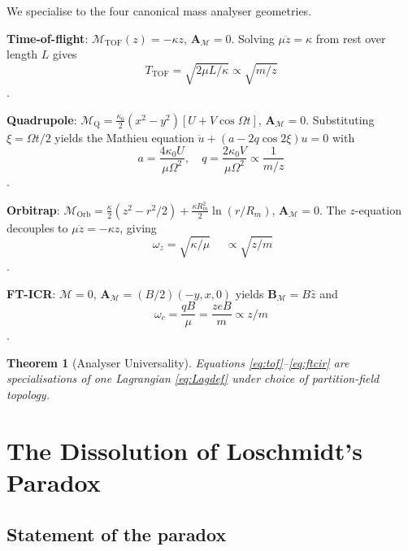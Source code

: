\documentclass[twocolumn,10pt,a4paper]{article}
\theoremstyle{thmstyle}
\newtheorem{theorem}{Theorem}[section]
\theoremstyle{definition}
\theoremstyle{remark}
\newcommand{\Depth}{\mathcal{M}}
\newcommand{\partinert}{\mu}
\newcommand{\Apartition}{\mathbf{A}_{\Depth}}
\begin{document}
We specialise to the four canonical mass analyser geometries.

\textbf{Time-of-flight}: $\Depth_{\mathrm{TOF}}(z)=-\kappa z$,
$\Apartition=0$. Solving $\partinert\ddot z=\kappa$ from rest over
length $L$ gives
\begin{equation}
T_{\mathrm{TOF}}=\sqrt{2\partinert L/\kappa}\propto\sqrt{m/z}
\label{eq:tof}
\end{equation}
\citep{wiley1955}.

\textbf{Quadrupole}: $\Depth_{\mathrm{Q}}=\tfrac{\kappa_{0}}{2}(x^{2}-y^{2})[U+V\cos\Omega t]$,
$\Apartition=0$. Substituting $\xi=\Omega t/2$ yields the Mathieu
equation $\ddot u+(a-2q\cos 2\xi)u=0$ with
\begin{equation}
a=\frac{4\kappa_{0}U}{\partinert\Omega^{2}},\quad
q=\frac{2\kappa_{0}V}{\partinert\Omega^{2}}\propto\frac{1}{m/z}
\label{eq:mathieu}
\end{equation}
\citep{paul1990,march2005}.

\textbf{Orbitrap}: $\Depth_{\mathrm{Orb}}=\tfrac{\kappa}{2}(z^{2}-r^{2}/2)
+\tfrac{\kappa R_{m}^{2}}{2}\ln(r/R_{m})$, $\Apartition=0$. The
$z$-equation decouples to $\partinert\ddot z=-\kappa z$, giving
\begin{equation}
\boxed{\;\omega_{z}=\sqrt{\kappa/\partinert}\;}
\quad\propto\sqrt{z/m}
\label{eq:orb}
\end{equation}
\citep{makarov2000}.

\textbf{FT-ICR}: $\Depth=0$, $\Apartition=(B/2)(-y,x,0)$ yields
$\mathbf{B}_{\Depth}=B\hat z$ and
\begin{equation}
\omega_{c}=\frac{qB}{\partinert}=\frac{zeB}{m}\propto z/m
\label{eq:ftcir}
\end{equation}
\citep{marshall1998}.

\begin{theorem}[Analyser Universality]
\label{thm:univ}
Equations \eqref{eq:tof}--\eqref{eq:ftcir} are specialisations of one
Lagrangian \eqref{eq:Lagdef} under choice of partition-field topology.
\end{theorem}

\section{The Dissolution of Loschmidt's Paradox}
\label{sec:dissolution}

\subsection{Statement of the paradox}
\end{document}
